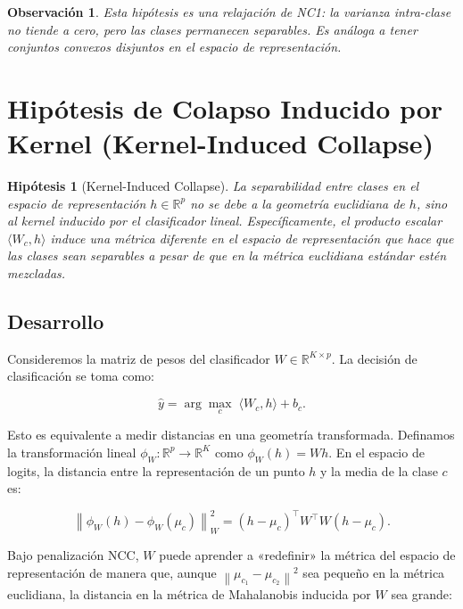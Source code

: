 \documentclass[12pt,a4paper]{report}
\newtheorem{hypothesis}{Hipótesis}[chapter]
\newtheorem{remark}{Observación}[chapter]
\newcommand{\R}{\mathbb{R}}
\newcommand{\norm}[1]{\left\lVert#1\right\rVert}
\newcommand{\inner}[2]{\langle #1, #2 \rangle}
\begin{document}
\begin{remark}
Esta hipótesis es una relajación de NC1: la varianza intra-clase no tiende a cero, pero las clases permanecen separables. Es análoga a tener conjuntos convexos disjuntos en el espacio de representación.
\end{remark}

\section{Hipótesis de Colapso Inducido por Kernel (Kernel-Induced Collapse)}
\label{sec:kernel}

\begin{hypothesis}[Kernel-Induced Collapse]
La separabilidad entre clases en el espacio de representación $h \in \R^p$ no se debe a la geometría euclidiana de $h$, sino al \emph{kernel inducido por el clasificador lineal}. Específicamente, el producto escalar $\inner{W_c}{h}$ induce una métrica diferente en el espacio de representación que hace que las clases sean separables a pesar de que en la métrica euclidiana estándar estén mezcladas.
\end{hypothesis}

\subsection{Desarrollo}

Consideremos la matriz de pesos del clasificador $W \in \R^{K \times p}$. La decisión de clasificación se toma como:

\begin{equation}
    \hat{y} = \arg\max_c \; \inner{W_c}{h} + b_c.
\end{equation}

Esto es equivalente a medir distancias en una geometría transformada. Definamos la transformación lineal $\phi_W: \R^p \to \R^K$ como $\phi_W(h) = Wh$. En el espacio de logits, la distancia entre la representación de un punto $h$ y la media de la clase $c$ es:

\begin{equation}
    \norm{\phi_W(h) - \phi_W(\mu_c)}^2_W = (h - \mu_c)^\top W^\top W (h - \mu_c).
\end{equation}

Bajo penalización NCC, $W$ puede aprender a «redefinir» la métrica del espacio de representación de manera que, aunque $\norm{\mu_{c_1} - \mu_{c_2}}^2$ sea pequeño en la métrica euclidiana, la distancia en la métrica de Mahalanobis inducida por $W$ sea grande:
\end{document}
